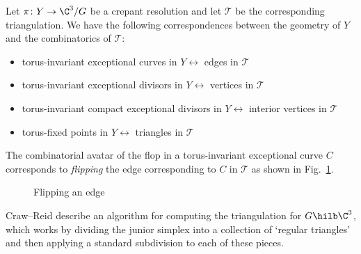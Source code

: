 \documentclass[leqno,11pt,a4paper]{amsart}
\begin{document}
Let $\pi\colon Y\to\C^3/G$ be a crepant resolution and let $\mathcal{T}$ be the corresponding triangulation. We have the following correspondences between the geometry of $Y$ and the combinatorics of $\mathcal{T}$:
\begin{itemize}
\item torus-invariant exceptional curves in $Y\longleftrightarrow$ edges in $\mathcal{T}$
\item torus-invariant exceptional divisors in $Y\longleftrightarrow$ vertices in $\mathcal{T}$
\item torus-invariant compact exceptional divisors in $Y\longleftrightarrow$ interior vertices in $\mathcal{T}$
\item torus-fixed points in $Y\longleftrightarrow$ triangles in $\mathcal{T}$
\end{itemize}

The combinatorial avatar of the flop in a torus-invariant exceptional curve $C$ corresponds to \emph{flipping} the edge corresponding to $C$ in $\mathcal{T}$ as shown in Fig.~\ref{fig:flip}.

\begin{figure}[h]
\begin{center}
\end{center}
\caption{Flipping an edge}
\label{fig:flip}
\end{figure}

Craw--Reid \cite{cr_how_02} describe an algorithm for computing the triangulation for $G\hilb\C^3$, which works by dividing the junior simplex into a collection of `regular triangles' \cite[\S1.2]{cr_how_02} and then applying a standard subdivision to each of these pieces.
\end{document}
